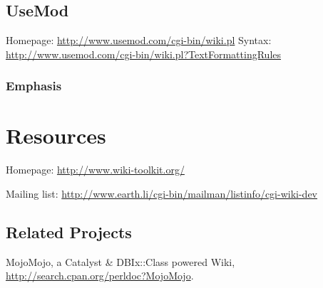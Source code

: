 \subsection{UseMod}
Homepage: \url{http://www.usemod.com/cgi-bin/wiki.pl}
Syntax: \url{http://www.usemod.com/cgi-bin/wiki.pl?TextFormattingRules}

\subsubsection{Emphasis}

\section{Resources}

Homepage: \url{http://www.wiki-toolkit.org/}

Mailing list: \url{http://www.earth.li/cgi-bin/mailman/listinfo/cgi-wiki-dev}

\subsection{Related Projects}
MojoMojo, a Catalyst \& DBIx::Class powered Wiki,
\url{http://search.cpan.org/perldoc?MojoMojo}.


    
